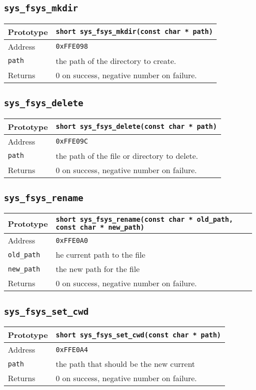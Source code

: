 \subsection*{\texttt{sys\_fsys\_mkdir}}
\begin{tabular}{|l||l|} \hline
Prototype & \lstinline!short sys_fsys_mkdir(const char * path)! \\ \hline
Address & \texttt{0xFFE098} \\ \hline
\lstinline!path! & the path of the directory to create. \\ \hline
Returns & 0 on success, negative number on failure. \\ \hline
\end{tabular}

\subsection*{\texttt{sys\_fsys\_delete}}
\begin{tabular}{|l||l|} \hline
Prototype & \lstinline!short sys_fsys_delete(const char * path)! \\ \hline
Address & \texttt{0xFFE09C} \\ \hline
\lstinline!path! & the path of the file or directory to delete. \\ \hline
Returns & 0 on success, negative number on failure. \\ \hline
\end{tabular}

\subsection*{\texttt{sys\_fsys\_rename}}
\begin{tabular}{|l||l|} \hline
Prototype & \lstinline!short sys_fsys_rename(const char * old_path, const char * new_path)! \\ \hline
Address & \texttt{0xFFE0A0} \\ \hline
\lstinline!old_path! & he current path to the file \\ \hline
\lstinline!new_path! & the new path for the file \\ \hline
Returns & 0 on success, negative number on failure. \\ \hline
\end{tabular}

\subsection*{\texttt{sys\_fsys\_set\_cwd}}
\begin{tabular}{|l||l|} \hline
Prototype & \lstinline!short sys_fsys_set_cwd(const char * path)! \\ \hline
Address & \texttt{0xFFE0A4} \\ \hline
\lstinline!path! & the path that should be the new current \\ \hline
Returns & 0 on success, negative number on failure. \\ \hline
\end{tabular}

